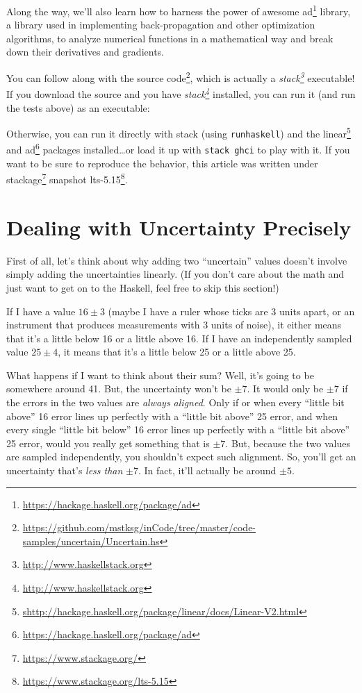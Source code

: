 \documentclass[]{article}
\newenvironment{Shaded}{}{}
\newcommand{\ExtensionTok}[1]{#1}
\newcommand{\NormalTok}[1]{#1}
\renewcommand{\href}[2]{#2\footnote{\url{#1}}}
\begin{document}
Along the way, we'll also learn how to harness the power of awesome
\href{https://hackage.haskell.org/package/ad}{ad} library, a library used in
implementing back-propagation and other optimization algorithms, to analyze
numerical functions in a mathematical way and break down their derivatives and
gradients.

You can follow along with
\href{https://github.com/mstksg/inCode/tree/master/code-samples/uncertain/Uncertain.hs}{the
source code}, which is actually a
\emph{\href{http://www.haskellstack.org}{stack}} executable! If you download the
source and you have \emph{\href{http://www.haskellstack.org}{stack}} installed,
you can run it (and run the tests above) as an executable:

\begin{Shaded}
\end{Shaded}

Otherwise, you can run it directly with stack (using \texttt{runhaskell}) and
the
\href{shttp://hackage.haskell.org/package/linear/docs/Linear-V2.html}{linear}
and \href{https://hackage.haskell.org/package/ad}{ad} packages
installed\ldots or load it up with \texttt{stack\ ghci} to play with it. If you
want to be sure to reproduce the behavior, this article was written under
\href{https://www.stackage.org/}{stackage} snapshot
\href{https://www.stackage.org/lts-5.15}{lts-5.15}.

\section{Dealing with Uncertainty
Precisely}\label{dealing-with-uncertainty-precisely}

First of all, let's think about why adding two ``uncertain'' values doesn't
involve simply adding the uncertainties linearly. (If you don't care about the
math and just want to get on to the Haskell, feel free to skip this section!)

If I have a value \(16 \pm 3\) (maybe I have a ruler whose ticks are 3 units
apart, or an instrument that produces measurements with 3 units of noise), it
either means that it's a little below 16 or a little above 16. If I have an
independently sampled value \(25 \pm 4\), it means that it's a little below 25
or a little above 25.

What happens if I want to think about their sum? Well, it's going to be
somewhere around 41. But, the uncertainty won't be \(\pm 7\). It would only be
\(\pm 7\) if the errors in the two values are \emph{always aligned}. Only if or
when every ``little bit above'' 16 error lines up perfectly with a ``little bit
above'' 25 error, and when every single ``little bit below'' 16 error lines up
perfectly with a ``little bit above'' 25 error, would you really get something
that is \(\pm
7\). But, because the two values are sampled independently, you shouldn't expect
such alignment. So, you'll get an uncertainty that's \emph{less than} \(\pm
7\). In fact, it'll actually be around \(\pm 5\).
\end{document}
